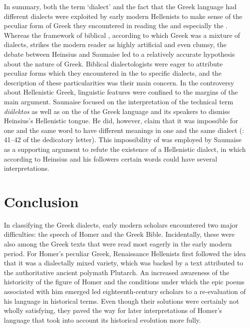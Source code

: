In summary, both the term ‘dialect’ and the fact that the Greek language had different dialects were exploited by early modern Hellenists to make sense of the peculiar form of Greek they encountered in reading the  and especially the . Whereas the framework of biblical , according to which  Greek was a mixture of dialects, strikes the modern reader as highly artificial and even clumsy, the debate between Heinsius and Saumaise led to a relatively accurate hypothesis about the nature of  Greek. Biblical dialectologists were eager to attribute peculiar forms which they encountered in the  to specific dialects, and the description of these particularities was their main concern. In the controversy about Hellenistic Greek, linguistic features were confined to the margins of the main argument. Saumaise focused on the interpretation of the technical term \textit{diálektos} as well as on the  of the Greek language and its speakers to dismiss Heinsius’s Hellenistic tongue. He did, however, claim that it was impossible for one and the same word to have different meanings in one and the same dialect (\citealt{Saumaise1643a}: 41–42 of the dedicatory letter). This impossibility of  was employed by Saumaise as a supporting argument to refute the existence of a Hellenistic dialect, in which according to Heinsius and his followers certain words could have several interpretations.

\section{Conclusion}\label{sec:4.7}

In classifying the Greek dialects, early modern scholars encountered two major difficulties: the speech of Homer and the Greek Bible. Incidentally, these were also among the Greek texts that were read most eagerly in the early modern period. For Homer’s peculiar Greek, Renaissance Hellenists first followed the idea that it was a dialectally mixed variety, which was backed by a text attributed to the authoritative ancient polymath Plutarch. An increased awareness of the historicity of the figure of Homer and the conditions under which the epic poems associated with him emerged led eighteenth-century scholars to a re-evaluation of his language in historical terms. Even though their solutions were certainly not wholly satisfying, they paved the way for later interpretations of Homer’s language that took into account its historical evolution more fully.

